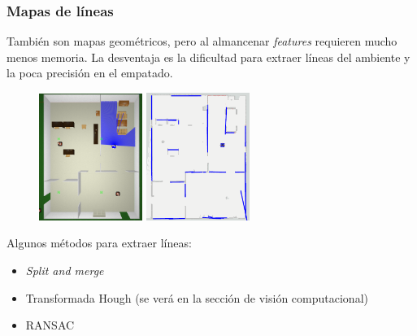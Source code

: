 \documentclass[10pt,spanish,aspectratio=1610]{beamer}
\begin{document}
\begin{frame}\frametitle{Mapas de líneas}
  También son mapas geométricos, pero al almancenar \textit{features} requieren mucho menos memoria. La desventaja es la dificultad para extraer líneas del ambiente y la poca precisión en el empatado. 
  \begin{figure}
    \centering
    \includegraphics[width=0.3\textwidth]{Figures/MapLinesGazebo.png}
    \includegraphics[width=0.3\textwidth]{Figures/MapLines.png}
  \end{figure}
  Algunos métodos para extraer líneas:
  \begin{itemize}
  \item \textit{Split and merge}
  \item Transformada Hough (se verá en la sección de visión computacional)
  \item RANSAC
  \end{itemize}
\end{frame}
\end{document}
